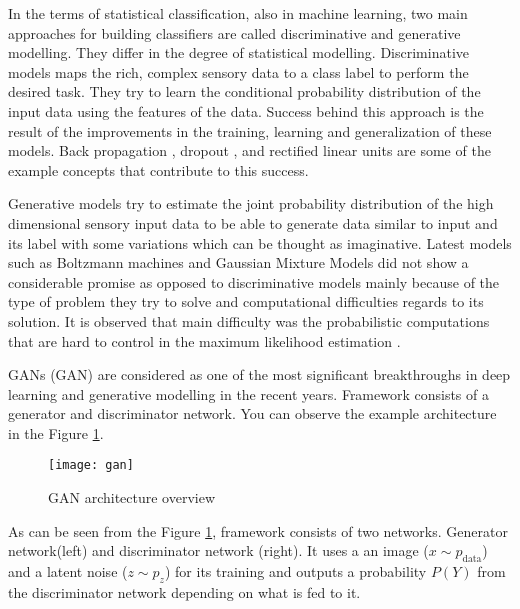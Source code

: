 In the terms of statistical classification, also in machine learning, two main approaches for building 
classifiers are called discriminative and generative modelling. They differ in the degree of statistical 
modelling\cite{gdjabra}. Discriminative models maps the rich, complex sensory data to a class label to
perform the desired task. They try to learn the conditional probability distribution of the input
data using the features of the data. Success behind this approach is the result of the
improvements in the training, learning and generalization of these models. Back propagation
\cite{Widrow2008AppendixGT}, dropout \cite{Srivastava2014DropoutAS}, and rectified linear
units\cite{Glorot2011DeepSR} are some of the example concepts that contribute to this success.

Generative models try to estimate the joint probability distribution of the high dimensional sensory 
input data to be able to generate data similar to input and its label with some variations which can be 
thought as imaginative. Latest models such as Boltzmann machines \cite{Salakhutdinov2009DeepBM} and Gaussian Mixture Models 
\cite{Reynolds2009GaussianMM} did not show a considerable promise as opposed to discriminative models mainly 
because of the type of problem they try to solve and computational difficulties regards to its solution. 
It is observed that main difficulty was the probabilistic computations that are hard to control in the maximum 
likelihood estimation \cite{Goodfellow:2014:GAN:2969033.2969125,pmlr-v5-salakhutdinov09a}.

GANs (GAN)\cite{Goodfellow:2014:GAN:2969033.2969125} are considered as one of 
the most significant breakthroughs in deep learning and generative modelling in the recent years. Framework 
consists of a generator and discriminator network. You can observe the example architecture in the Figure 
\ref{fig:gan_network}. 

\begin{figure}[h]
	\centering
	\texttt{[image: gan]}
    \caption{GAN architecture overview}
    \label{fig:gan_network}
\end{figure}

As can be seen from the Figure \ref{fig:gan_network}, framework consists of two networks. Generator network(left) and discriminator network (right). It uses a an image ($x \sim p_{\text{data}}$) and a latent noise ($z \sim p_z$) for its training and outputs a probability $P(Y)$ from the discriminator network depending on what is fed to it.

